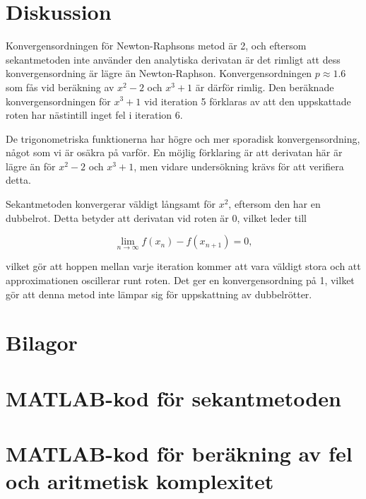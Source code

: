 \documentclass[a4paper,titlepage]{article}
\begin{document}
\section{Diskussion}

Konvergensordningen för Newton-Raphsons metod är 2, och eftersom sekantmetoden
inte använder den analytiska derivatan är det rimligt att dess konvergensordning är lägre
än Newton-Raphson. Konvergensordningen $p\approx1.6$ som fås vid beräkning av $x^2-2$ och
$x^3 + 1$ är därför rimlig. Den beräknade konvergensordningen för $x^3 + 1$ vid
iteration 5 förklaras av att den uppskattade roten har nästintill inget fel i
iteration 6.

De trigonometriska funktionerna har högre och mer sporadisk konvergensordning,
något som vi är osäkra på varför. En möjlig förklaring är att derivatan här är
lägre än för $x^2-2$ och $x^3 + 1$, men vidare undersökning krävs för att
verifiera detta.

Sekantmetoden konvergerar väldigt långsamt för $x^2$, eftersom den har en
dubbelrot. Detta betyder att derivatan vid roten är 0, vilket leder till

\[
    \lim_{n \to \infty} f(x_n) - f(x_{n+1}) = 0,
\]

vilket gör att hoppen mellan varje iteration kommer att vara väldigt stora och att
approximationen oscillerar runt roten. Det ger en konvergensordning på
1, vilket gör att denna metod inte lämpar sig för uppskattning av dubbelrötter.

\section*{Bilagor}
\appendix

\section{MATLAB-kod för sekantmetoden}


\section{MATLAB-kod för beräkning av fel och aritmetisk komplexitet}
\label{sec:testcode}


\end{document}
